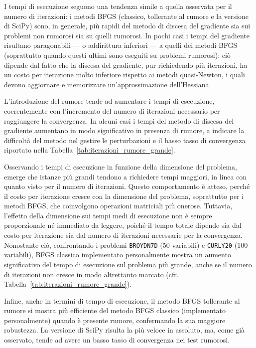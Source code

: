 I tempi di esecuzione seguono una tendenza simile a quella osservata per il numero di iterazioni: i metodi BFGS (classico, tollerante al rumore e la versione di SciPy) sono, in generale, più rapidi del metodo di discesa del gradiente sia sui problemi non rumorosi sia su quelli rumorosi. In pochi casi i tempi del gradiente risultano paragonabili — o addirittura inferiori — a quelli dei metodi BFGS (soprattutto quando questi ultimi sono eseguiti su problemi rumorosi): ciò dipende dal fatto che la discesa del gradiente, pur richiedendo più iterazioni, ha un costo per iterazione molto inferiore rispetto ai metodi quasi-Newton, i quali devono aggiornare e memorizzare un’approssimazione dell’Hessiana.

L’introduzione del rumore tende ad aumentare i tempi di esecuzione, coerentemente con l’incremento del numero di iterazioni necessario per raggiungere la convergenza. In alcuni casi i tempi del metodo di discesa del gradiente aumentano in modo significativo in presenza di rumore, a indicare la difficoltà del metodo nel gestire le perturbazioni e il basso tasso di convergenza riportato nella Tabella~\ref{tab:iterazioni_rumore_grande}.

Osservando i tempi di esecuzione in funzione della dimensione del problema, emerge che istanze più grandi tendono a richiedere tempi maggiori, in linea con quanto visto per il numero di iterazioni. Questo comportamento è atteso, perché il costo per iterazione cresce con la dimensione del problema, soprattutto per i metodi BFGS, che coinvolgono operazioni matriciali più onerose. Tuttavia, l’effetto della dimensione sui tempi medi di esecuzione non è sempre proporzionale né immediato da leggere, poiché il tempo totale dipende sia dal costo per iterazione sia dal numero di iterazioni necessarie per la convergenza. Nonostante ciò, confrontando i problemi \texttt{BROYDN7D} (50 variabili) e \texttt{CURLY20} (100 variabili), BFGS classico implementato personalmente mostra un aumento significativo del tempo di esecuzione sul problema più grande, anche se il numero di iterazioni non cresce in modo altrettanto marcato (cfr. Tabella~\ref{tab:iterazioni_rumore_grande}).

Infine, anche in termini di tempo di esecuzione, il metodo BFGS tollerante al rumore si mostra più efficiente del metodo BFGS classico (implementato personalmente) quando è presente rumore, confermando la sua maggiore robustezza. La versione di SciPy risulta la più veloce in assoluto, ma, come già osservato, tende ad avere un basso tasso di convergenza nei test rumorosi.

